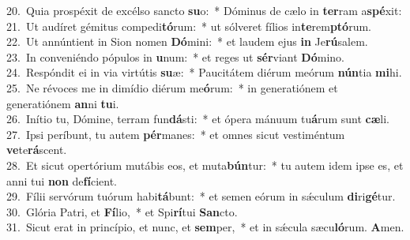 {20.~}Quia prospéxit de excélso sancto \textbf{su}o:~* Dóminus de cælo in \textbf{ter}ram a\textbf{spé}xit:\\
{21.~}Ut audíret gémitus compedi\textbf{tó}rum:~* ut sólveret fílios in\textbf{te}rem\textbf{ptó}rum.\\
{22.~}Ut annúntient in Sion nomen \textbf{Dó}mini:~* et laudem ejus \textbf{in} Je\textbf{rú}salem.\\
{23.~}In conveniéndo pópulos in \textbf{u}num:~* et reges ut \textbf{sér}viant \textbf{Dó}mino.\\
{24.~}Respóndit ei in via virtútis \textbf{su}æ:~* Paucitátem diérum meórum \textbf{nún}tia \textbf{mi}hi.\\
{25.~}Ne révoces me in dimídio diérum me\textbf{ó}rum:~* in generatiónem et generatiónem \textbf{an}ni \textbf{tu}i.\\
{26.~}Inítio tu, Dómine, terram fun\textbf{dá}sti:~* et ópera mánuum tu\textbf{á}rum sunt \textbf{cæ}li.\\
{27.~}Ipsi períbunt, tu autem \textbf{pér}manes:~* et omnes sicut vestiméntum \textbf{ve}te\textbf{rá}scent.\\
{28.~}Et sicut opertórium mutábis eos, et muta\textbf{bún}tur:~* tu autem idem ipse es, et anni tui \textbf{non} de\textbf{fí}cient.\\
{29.~}Fílii servórum tuórum habi\textbf{tá}bunt:~* et semen eórum in sǽculum \textbf{di}ri\textbf{gé}tur.\\
{30.~}Glória Patri, et \textbf{Fí}lio,~* et Spi\textbf{rí}tui \textbf{San}cto.\\
{31.~}Sicut erat in princípio, et nunc, et \textbf{sem}per,~* et in sǽcula sæcu\textbf{ló}rum. \textbf{A}men.\\
